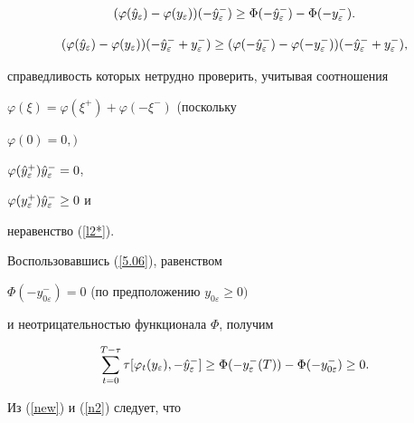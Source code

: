 \begin{pf}
\begin{equation}
(\varphi(\Hat{y}_\varepsilon) - \varphi(y_\varepsilon))


(-\Hat{y}_\varepsilon^{-}) \ge


\Phi(-\Hat{y}_\varepsilon^{-}) - \Phi(-y_\varepsilon^{-}).


\label{5.06}


\end{equation}


\begin{equation}


(\varphi(\Hat{y}_\varepsilon) - \varphi(y_\varepsilon))


(-\Hat{y}_\varepsilon^{-} + y_\varepsilon^{-})


\ge (\varphi(-\Hat{y}_\varepsilon^{-}) - \varphi(-y_\varepsilon^{-}))


(-\Hat{y}_\varepsilon^{-} + y_\varepsilon^{-}),


\label{new}


\end{equation}


справедливость которых нетрудно проверить, учитывая соотношения


$\varphi(\xi) = \varphi(\xi^{+})+ \varphi(-\xi^{-})$ (поскольку


$\varphi(0) = 0,)$


$\varphi(\Hat{y}_\varepsilon^{+})\Hat{y}_\varepsilon^{-} = 0$,


$\varphi(y_\varepsilon^{+})\Hat{y}_\varepsilon^{-} \ge 0$ и


неравенство (\ref{l2*}).





Воспользовавшись (\ref{5.06}), равенством


$\Phi(-y_{0\varepsilon}^{-}) = 0$ (по предположению $y_{0\varepsilon} \ge 0)$


и неотрицательностью функционала $\Phi$, получим


\begin{equation}


\sum^{T-\tau}_{t=0}\tau [ \varphi_{t}(y_\varepsilon),


 -\Hat{y}_\varepsilon^{-}]


\ge \Phi(-y_\varepsilon^{-}(T)) - \Phi(-y_{0\varepsilon}^{-})


 \ge 0.\label{zb}


\end{equation}


Из (\ref{new}) и (\ref{n2}) следует, что


\begin{equation}



\end{equation}
\end{pf}
